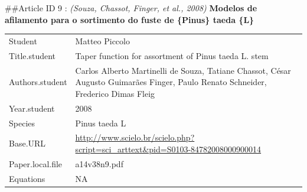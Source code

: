 \documentclass[]{article}
\begin{document}
\#\#Article ID 9 : \emph{(Souza, Chassot, Finger, et al., 2008)}
\textbf{Modelos de afilamento para o sortimento do fuste de \{Pinus\}
taeda \{L\}}

\begin{longtable}[]{@{}ll@{}}
\toprule
\endhead
\begin{minipage}[t]{0.21\columnwidth}\raggedright
Student\strut
\end{minipage} & \begin{minipage}[t]{0.73\columnwidth}\raggedright
Matteo Piccolo\strut
\end{minipage}\tabularnewline
\begin{minipage}[t]{0.21\columnwidth}\raggedright
Title.student\strut
\end{minipage} & \begin{minipage}[t]{0.73\columnwidth}\raggedright
Taper function for assortment of Pinus taeda L. stem\strut
\end{minipage}\tabularnewline
\begin{minipage}[t]{0.21\columnwidth}\raggedright
Authors.student\strut
\end{minipage} & \begin{minipage}[t]{0.73\columnwidth}\raggedright
Carlos Alberto Martinelli de Souza, Tatiane Chassot, César Augusto
Guimarães Finger, Paulo Renato Schneider, Frederico Dimas Fleig\strut
\end{minipage}\tabularnewline
\begin{minipage}[t]{0.21\columnwidth}\raggedright
Year.student\strut
\end{minipage} & \begin{minipage}[t]{0.73\columnwidth}\raggedright
2008\strut
\end{minipage}\tabularnewline
\begin{minipage}[t]{0.21\columnwidth}\raggedright
Species\strut
\end{minipage} & \begin{minipage}[t]{0.73\columnwidth}\raggedright
Pinus taeda L\strut
\end{minipage}\tabularnewline
\begin{minipage}[t]{0.21\columnwidth}\raggedright
Base.URL\strut
\end{minipage} & \begin{minipage}[t]{0.73\columnwidth}\raggedright
\url{http://www.scielo.br/scielo.php?script=sci_arttext\&pid=S0103-84782008000900014}\strut
\end{minipage}\tabularnewline
\begin{minipage}[t]{0.21\columnwidth}\raggedright
Paper.local.file\strut
\end{minipage} & \begin{minipage}[t]{0.73\columnwidth}\raggedright
a14v38n9.pdf\strut
\end{minipage}\tabularnewline
\begin{minipage}[t]{0.21\columnwidth}\raggedright
Equations\strut
\end{minipage} & \begin{minipage}[t]{0.73\columnwidth}\raggedright
NA\strut
\end{minipage}\tabularnewline
\bottomrule
\end{longtable}
\end{document}
